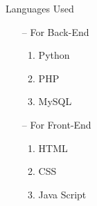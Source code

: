\documentclass{beamer}
\begin{document}
\begin{frame}{Languages Used}
       \begin{itemize}
           \item[--] For Back-End
           \linebreak
           \begin{enumerate}
               \item Python
               \linebreak
               \item PHP
               \linebreak
               \item MySQL
               \linebreak
           \end{enumerate}
           
           \item[--] For Front-End
           \linebreak
           \begin{enumerate}
               \item HTML
               \linebreak
               \item CSS
               \linebreak
               \item Java Script
           \end{enumerate}
       \end{itemize}
    
\end{frame}
\end{document}
